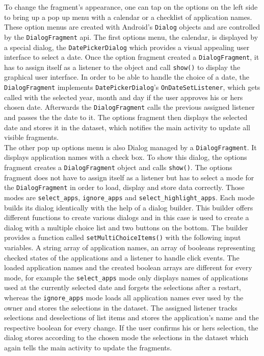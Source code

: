 To  change the fragment's appearance, one can tap on the options on the left side to bring up a pop up menu with a calendar or a checklist of application names. These option menus are created with Android's \lstinline{Dialog} objects and are controlled by the \lstinline{DialogFragment} api. The first options menu, the calendar, is displayed by a special dialog, the \lstinline{DatePickerDialog} which provides a visual appealing user interface to select a date. Once the option fragment created a \lstinline{DialogFragment}, it has to assign itself as a listener to the object and call \lstinline$show()$ to display the graphical user interface. In order to be able to handle the choice of a date, the \lstinline{DialogFragment} implements \lstinline{DatePickerDialog}'s \lstinline$OnDateSetListener$, which gets called with the selected year, month and day if the user approves his or hers chosen date. Afterwards the \lstinline{DialogFragment} calls the previous assigned listener and passes the the date to it. The options fragment then displays the selected date and stores it in the dataset, which notifies the main activity to update all visible fragments.\\
The other pop up options menu is also Dialog managed by a \lstinline{DialogFragment}. It displays application names with a check box. To show this dialog, the options fragment creates a \lstinline{DialogFragment} object and calls \lstinline$show()$. The options fragment does not have to assign itself as a listener but has to select a mode for the \lstinline{DialogFragment} in order to load, display and store data correctly. Those modes are \lstinline{select_apps}, \lstinline{ignore_apps} and \lstinline{select_highlight_apps}. Each mode builds its dialog identically with the help of a dialog builder. This builder offers different functions to create various dialogs and in this case is used to create a dialog with a multiple choice list and two buttons on the bottom. The builder provides a function called \lstinline$setMultiChoiceItems()$ with the following input variables. A string array of application names, an array of booleans representing checked states of the applications and a listener to handle click events. The loaded application names and the created boolean arrays are different for every mode, for example the \lstinline{select_apps} mode only displays names of applications used at the currently selected date and forgets the selections after a restart, whereas the \lstinline{ignore_apps} mode loads all application names ever used by the owner and stores the selections in the dataset. The assigned listener tracks selections and deselections of list items and stores the application's name and the respective boolean for every change. If the user confirms his or hers selection, the dialog stores according to the chosen mode the selections in the dataset which again tells the main activity to update the fragments.

